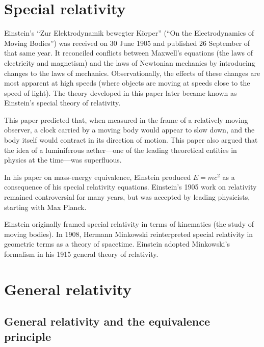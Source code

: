 \documentclass[twoside]{memoir}
\begin{document}
\chapter{Special relativity}\label{special-relativity}

Einstein's \enquote{Zur Elektrodynamik bewegter Körper} (\enquote{On the Electrodynamics of Moving Bodies}) was received on 30 June 1905 and published 26 September of that same year. It reconciled conflicts between Maxwell's equations (the laws of electricity and magnetism) and the laws of Newtonian mechanics by introducing changes to the laws of mechanics. Observationally, the effects of these changes are most apparent at high speeds (where objects are moving at speeds close to the speed of light). The theory developed in this paper later became known as Einstein's special theory of relativity.

This paper predicted that, when measured in the frame of a relatively moving observer, a clock carried by a moving body would appear to slow down, and the body itself would contract in its direction of motion. This paper also argued that the idea of a luminiferous aether---one of the leading theoretical entities in physics at the time---was superfluous. \cite{aBfxO}

In his paper on mass-energy equivalence, Einstein produced $E = mc^2$ as a consequence of his special relativity equations. Einstein's 1905 work on relativity remained controversial for many years, but was accepted by leading physicists, starting with  Max Planck. \cite{sBl2q}

Einstein originally framed special relativity in terms of kinematics  (the study of moving bodies). In 1908, Hermann Minkowski  reinterpreted special relativity in geometric terms as a theory of spacetime. Einstein adopted Minkowski's formalism in his 1915 general theory of relativity.

\chapter{General relativity}\label{general-relativity}

\section{General relativity and the equivalence principle}\label{general-relativity-and-the-equivalence-principle}
\end{document}

